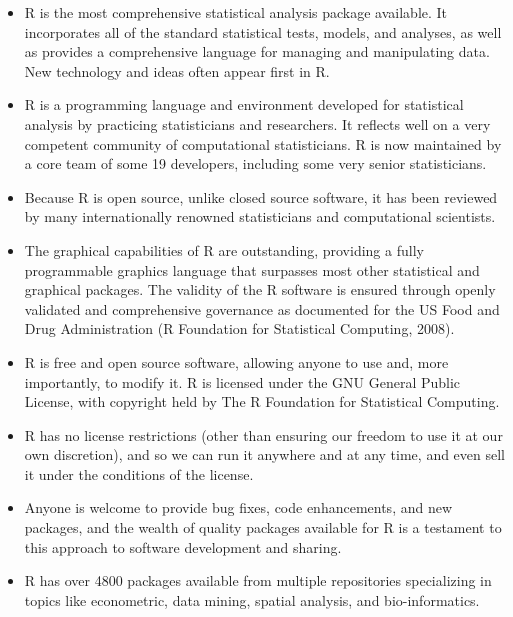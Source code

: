 \documentclass[12pt,letterpaper]{report}
\begin{document}
\begin{itemize}

\item R is the most comprehensive statistical analysis package available. It incorporates all of the standard statistical tests, models, and analyses, as well as provides a comprehensive language for managing and manipulating data. New technology and ideas often appear first in R.

\item R is a programming language and environment developed for statistical analysis by practicing statisticians and researchers. It reflects well on a very competent community of computational statisticians. R is now maintained by a core team of some 19 developers, including some very senior statisticians.

\item Because R is open source, unlike closed source software, it has been reviewed by many internationally renowned statisticians and computational scientists.

\item The graphical capabilities of R are outstanding, providing a fully programmable graphics language that surpasses most other statistical and graphical packages. The validity of the R software is ensured through openly validated and comprehensive governance as documented for the US Food and Drug Administration (R Foundation for Statistical Computing, 2008). 

\item R is free and open source software, allowing anyone to use and, more importantly, to modify it. R is licensed under the GNU General Public License, with copyright held by The R Foundation for Statistical Computing.

\item R has no license restrictions (other than ensuring our freedom to use it at our own discretion), and so we can run it anywhere and at any time, and even sell it under the conditions of the license.

\item Anyone is welcome to provide bug fixes, code enhancements, and new packages, and the wealth of quality packages available for R is a testament to this approach to software development and sharing.

\item R has over 4800 packages available from multiple repositories specializing in topics like econometric, data mining, spatial analysis, and bio-informatics.


\end{itemize}
\end{document}
